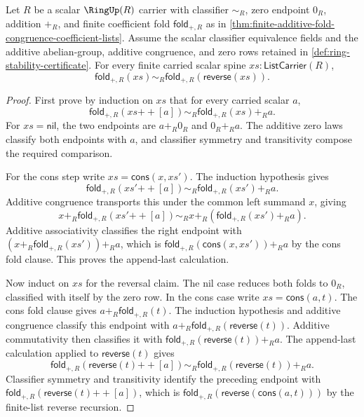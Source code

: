\begin{lemma}
\label{lem:finite-additive-fold-reversal-under-additive-commutativity}
Let $R$ be a scalar $\RingUp(R)$ carrier with classifier $\sim_R$, zero endpoint $0_R$, addition $+_R$, and finite coefficient fold $\mathsf{fold}_{+,R}$ as in \autoref{thm:finite-additive-fold-congruence-coefficient-lists}. Assume the scalar classifier equivalence fields and the additive abelian-group, additive congruence, and zero rows retained in \autoref{def:ring-stability-certificate}. For every finite carried scalar spine $xs:\mathsf{ListCarrier}(R)$,
$$
\mathsf{fold}_{+,R}(xs)\sim_R\mathsf{fold}_{+,R}(\mathsf{reverse}(xs)).
$$
\end{lemma}
\begin{proof}
First prove by induction on $xs$ that for every carried scalar $a$,
$$
\mathsf{fold}_{+,R}(xs{++}[a])\sim_R\mathsf{fold}_{+,R}(xs)+_R a.
$$
For $xs=\mathsf{nil}$, the two endpoints are $a+_R0_R$ and $0_R+_Ra$. The additive zero laws classify both endpoints with $a$, and classifier symmetry and transitivity compose the required comparison.

For the cons step write $xs=\mathsf{cons}(x,xs')$. The induction hypothesis gives
$$
\mathsf{fold}_{+,R}(xs'{++}[a])\sim_R\mathsf{fold}_{+,R}(xs')+_R a.
$$
Additive congruence transports this under the common left summand $x$, giving
$$
x+_R\mathsf{fold}_{+,R}(xs'{++}[a])
\sim_R
x+_R(\mathsf{fold}_{+,R}(xs')+_R a).
$$
Additive associativity classifies the right endpoint with $(x+_R\mathsf{fold}_{+,R}(xs'))+_R a$, which is $\mathsf{fold}_{+,R}(\mathsf{cons}(x,xs'))+_R a$ by the cons fold clause. This proves the append-last calculation.

Now induct on $xs$ for the reversal claim. The nil case reduces both folds to $0_R$, classified with itself by the zero row. In the cons case write $xs=\mathsf{cons}(a,t)$. The cons fold clause gives $a+_R\mathsf{fold}_{+,R}(t)$. The induction hypothesis and additive congruence classify this endpoint with $a+_R\mathsf{fold}_{+,R}(\mathsf{reverse}(t))$. Additive commutativity then classifies it with $\mathsf{fold}_{+,R}(\mathsf{reverse}(t))+_R a$. The append-last calculation applied to $\mathsf{reverse}(t)$ gives
$$
\mathsf{fold}_{+,R}(\mathsf{reverse}(t){++}[a])
\sim_R
\mathsf{fold}_{+,R}(\mathsf{reverse}(t))+_R a.
$$
Classifier symmetry and transitivity identify the preceding endpoint with $\mathsf{fold}_{+,R}(\mathsf{reverse}(t){++}[a])$, which is $\mathsf{fold}_{+,R}(\mathsf{reverse}(\mathsf{cons}(a,t)))$ by the finite-list reverse recursion.
\end{proof}


